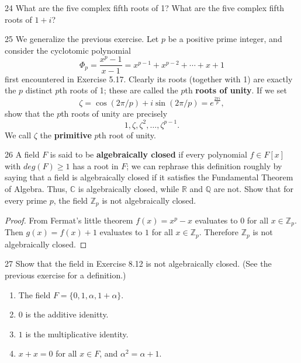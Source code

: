 \begin{problem}{24}
    What are the five complex fifth roots of 1? What are the five complex fifth roots of
    $1 + i$?
\end{problem}
\unsolved

\begin{problem}{25}
    We generalize the previous exercise. Let $p$ be a positive prime integer, and
    consider the cyclotomic polynomial
    \[\Phi_p = \frac{x^p - 1}{x - 1} = x^{p - 1} + x^{p - 2} + \cdots + x + 1\]
    first encountered in Exercise 5.17. Clearly its roots (together with 1) are exactly
    the $p$ distinct $p$th roots of 1; these are called the $p$th \textbf{roots of unity}.
    If we set
    \[\zeta = \cos(2\pi/p) + i\sin(2\pi/p) = e^{\frac{2\pi i}{p}},\]
    show that the $p$th roots of unity are precisely
    \[1, \zeta, \zeta^2, \ldots, \zeta^{p - 1}.\]
    We call $\zeta$ the \textbf{primitive} $p$th root of unity.
\end{problem}
\unsolved

\begin{problem}{26}
    A field $F$ is said to be \textbf{algebraically closed} if every polynomial 
    $f \in F[x]$ with $deg(F) \ge 1$ has a root in $F$; we can rephrase this 
    definition roughly by saying that a field is algebraically closed if it 
    satisfies the Fundamental Theorem of Algebra. Thus, $\mathbb{C}$ is 
    algebraically closed, while $\mathbb{R}$ and $\mathbb{Q}$ are not.
    Show that for every prime $p$, the field $\mathbb{Z}_p$ is not algebraically closed.
\end{problem}
\solved

\begin{proof}
    From Fermat's little theorem $f(x) = x^p - x$ evaluates to $0$ for all $x \in \mathbb{Z}_p$.
    Then $g(x) = f(x) + 1$ evaluates to $1$ for all $x \in \mathbb{Z}_p$.
    Therefore $\mathbb{Z}_p$ is not algebraically closed.
\end{proof}

\begin{problem}{27}
    Show that the field in Exercise 8.12 is not algebraically closed.
    (See the previous exercise for a definition.)
    \begin{enumerate}
        \item The field $F = \{0, 1, \alpha, 1 + \alpha\}$.
        \item $0$ is the additive idenitty.
        \item $1$ is the multiplicative identity.
        \item $x + x = 0$ for all $x \in F$, and $\alpha^2 = \alpha + 1$.
    \end{enumerate}
\end{problem}
\solved

